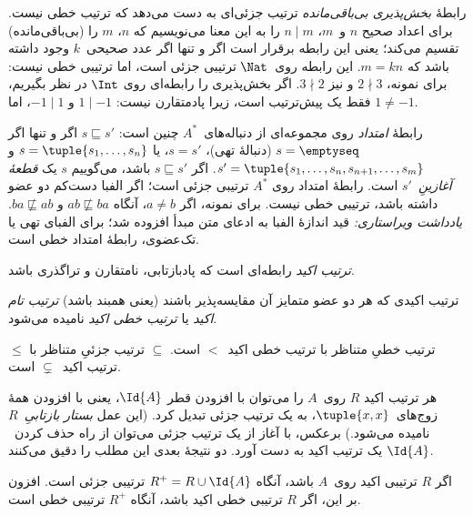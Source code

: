 \documentclass[../../../include/open-logic-section]{subfiles}
\begin{document}
\begin{ex}
رابطهٔ \emph{بخش‌پذیری بی‌باقی‌مانده} ترتیب جزئی‌ای به دست می‌دهد که
ترتیب خطی نیست. برای اعداد صحیح $n$ و~$m$، $n \mid m$ را به این معنا
می‌نویسیم که $n$، $m$ را (بی‌باقی‌مانده) تقسیم می‌کند؛ یعنی این رابطه
برقرار است اگر و تنها اگر عدد صحیحی~$k$ وجود داشته باشد که $m = kn$. این رابطه روی~$\Nat$
ترتیبی جزئی است، اما ترتیبی خطی نیست: برای نمونه، $2 \nmid 3$ و نیز
$3 \nmid
2$. اگر بخش‌پذیری را رابطه‌ای روی $\Int$ در نظر بگیریم، فقط یک
پیش‌ترتیب است، زیرا پادمتقارن نیست: $1 \mid -1$ و $-1 \mid 1$، اما
$1 \neq -1$.
\end{ex}

\begin{ex}
رابطهٔ \emph{امتداد} روی مجموعه‌ای از دنباله‌های~$A^*$ چنین است:
$s \sqsubseteq s'$ اگر و تنها اگر $s = \emptyseq$ (دنبالهٔ تهی)،
$s = s'$، یا $s = \tuple{s_1, \dots, s_n}$ و $s' =
\tuple{s_1, \dots, s_n, s_{n+1}, \dots, s_m}$. اگر $s \sqsubseteq s'$
باشد، می‌گوییم $s$ یک \emph{قطعهٔ آغازینِ}~$s'$ است. رابطهٔ امتداد
روی $A^*$ ترتیبی جزئی است؛ اگر الفبا دست‌کم دو عضو داشته باشد، ترتیبی خطی نیست. برای نمونه، اگر
$a \neq b$، آنگاه $ab \not\sqsubseteq ba$ و $ba \not\sqsubseteq ab$.
\emph{یادداشت ویراستاری:} قید اندازهٔ الفبا به ادعای متن مبدأ افزوده شد؛ برای الفبای تهی یا تک‌عضوی، رابطهٔ امتداد خطی است.
\end{ex}

\begin{defn}
\emph{ترتیب اکید} رابطه‌ای است که پادبازتابی، نامتقارن و تراگذری باشد.
\end{defn}

\begin{defn}
ترتیب اکیدی که هر دو عضو متمایز آن مقایسه‌پذیر باشند (یعنی همبند باشد) \emph{ترتیب تام اکید} یا
\emph{ترتیب خطی اکید} نامیده می‌شود.
\end{defn}

\begin{ex}
$\le$ ترتیب خطیِ متناظر با ترتیب خطی اکید~$<$ است. $\subseteq$ ترتیب
جزئیِ متناظر با ترتیب اکید~$\subsetneq$ است.
\end{ex}

هر ترتیب اکید $R$ روی~$A$ را می‌توان با افزودن قطر $\Id{A}$، یعنی با
افزودن همهٔ زوج‌های~$\tuple{x,
x}$، به یک ترتیب جزئی تبدیل کرد. (این عمل \emph{بستار بازتابیِ}~$R$
نامیده می‌شود.) برعکس، با آغاز از یک ترتیب جزئی می‌توان از راه حذف
کردن~$\Id{A}$ یک ترتیب اکید به دست آورد. دو نتیجهٔ بعدی این مطلب را
دقیق می‌کنند.

\begin{prop}
اگر $R$ ترتیبی اکید روی~$A$ باشد، آنگاه $R^+ = R \cup \Id{A}$ ترتیبی
جزئی است. افزون بر این، اگر $R$ ترتیبی خطی اکید باشد، آنگاه $R^+$
ترتیبی خطی است.
\end{prop}
\end{document}
